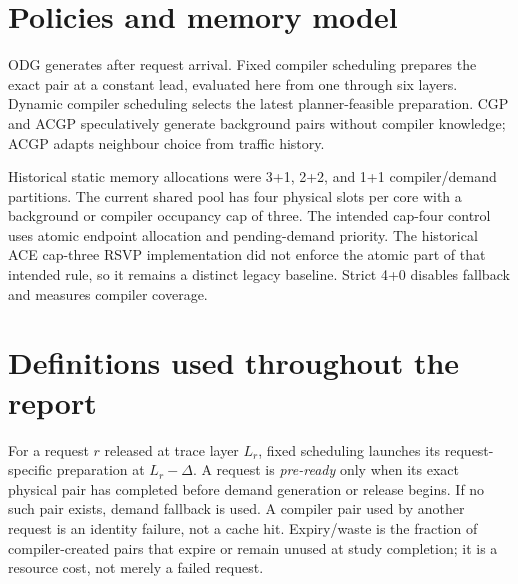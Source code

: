 \documentclass[11pt,a4paper]{report}
\begin{document}
\section{Policies and memory model}
ODG generates after request arrival. Fixed compiler scheduling prepares the
exact pair at a constant lead, evaluated here from one through six layers.
Dynamic compiler scheduling selects the
latest planner-feasible preparation. CGP and ACGP speculatively generate
background pairs without compiler knowledge; ACGP adapts neighbour choice from
traffic history.

Historical static memory allocations were 3+1, 2+2, and 1+1 compiler/demand
partitions. The current shared pool has four physical slots per core with a
background or compiler occupancy cap of three. The intended cap-four control
uses atomic endpoint allocation and pending-demand priority. The historical ACE
cap-three RSVP implementation did not enforce the atomic part of that intended
rule, so it remains a distinct legacy baseline. Strict 4+0 disables fallback
and measures compiler coverage.

\section{Definitions used throughout the report}
For a request $r$ released at trace layer $L_r$, fixed scheduling launches its
request-specific preparation at $L_r-\Delta$. A request is \emph{pre-ready}
only when its exact physical pair has completed before demand generation or
release begins. If no such pair exists, demand fallback is used. A compiler pair
used by another request is an identity failure, not a cache hit. Expiry/waste is
the fraction of compiler-created pairs that expire or remain unused at study
completion; it is a resource cost, not merely a failed request.
\end{document}
